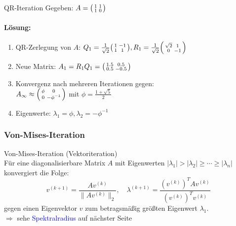\begin{example2}{QR-Iteration} Gegeben:
$A = \begin{psmallmatrix}
1 & 1 \\
1 & 0
\end{psmallmatrix}$

\paragraph{Lösung:}
\begin{enumerate}
    \item QR-Zerlegung von $A$:
    $Q_1 = \frac{1}{\sqrt{2}}\begin{psmallmatrix}
    1 & -1 \\
    1 & 1
    \end{psmallmatrix}, 
    R_1 = \frac{1}{\sqrt{2}}\begin{psmallmatrix}
    \sqrt{2} & 1 \\
    0 & -1
    \end{psmallmatrix}$
    \vspace{1mm}
    \item Neue Matrix:
    $A_1 = R_1Q_1 = \begin{psmallmatrix}
    1.5 & 0.5 \\
    0.5 & -0.5
    \end{psmallmatrix}$
    \vspace{1mm}
    \item Konvergenz nach mehreren Iterationen gegen:\\
    $A_\infty \approx \begin{psmallmatrix}
    \phi & 0 \\
    0 & -\phi^{-1}
    \end{psmallmatrix}$
    mit $\phi = \frac{1+\sqrt{5}}{2}$
    \vspace{1mm}
    \item Eigenwerte: $\lambda_1 = \phi, \lambda_2 = -\phi^{-1}$
\end{enumerate}
\end{example2}

\subsubsection{Von-Mises-Iteration}

\begin{concept}{Von-Mises-Iteration (Vektoriteration)}\\
Für eine diagonalisierbare Matrix $A$ mit Eigenwerten $|\lambda_1| > |\lambda_2| \geq \cdots \geq |\lambda_n|$ konvergiert die Folge:
$$v^{(k+1)} = \frac{Av^{(k)}}{\|Av^{(k)}\|_2}, \quad
\lambda^{(k+1)} = \frac{(v^{(k)})^TAv^{(k)}}{(v^{(k)})^Tv^{(k)}}$$
gegen einen Eigenvektor $v$ zum betragsmäßig größten Eigenwert $\lambda_1$.\\
$\Rightarrow$ sehe \textcolor{blue}{Spektralradius} auf nächster Seite
\end{concept}

